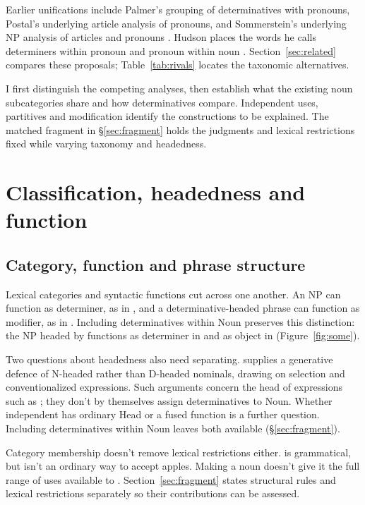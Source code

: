 \documentclass[12pt]{article}
\begin{document}
Earlier unifications include Palmer's grouping of determinatives with pronouns, Postal's underlying article analysis of pronouns, and Sommerstein's underlying NP analysis of articles and pronouns \citep{palmer1924,postal1966,sommerstein1972}. Hudson places the words he calls determiners within pronoun and pronoun within noun \citep{hudson2004determiners,hudson2010wordgrammar}. Section~\ref{sec:related} compares these proposals; Table~\ref{tab:rivals} locates the taxonomic alternatives.

I first distinguish the competing analyses, then establish what the existing noun subcategories share and how determinatives compare. Independent uses, partitives and modification identify the constructions to be explained. The matched fragment in §\ref{sec:fragment} holds the judgments and lexical restrictions fixed while varying taxonomy and headedness.

\section{Classification, headedness and function}\label{sec:alternatives}

\subsection{Category, function and phrase structure}

Lexical categories and syntactic functions cut across one another. An NP can function as determiner, as in , and a determinative-headed phrase can function as modifier, as in  \citep{payne2010,pullummiller2022nps}. Including determinatives within Noun preserves this distinction: the NP headed by  functions as determiner in  and as object in  (Figure~\ref{fig:some}).

Two questions about headedness also need separating. \textcite{bruening2020nominal} supplies a generative defence of N-headed rather than D-headed nominals, drawing on selection and conventionalized expressions. Such arguments concern the head of expressions such as ; they don't by themselves assign determinatives to Noun. Whether independent  has ordinary Head or a fused function is a further question. Including determinatives within Noun leaves both available (§\ref{sec:fragment}).

Category membership doesn't remove lexical restrictions either.  is grammatical, but  isn't an ordinary way to accept apples. Making  a noun doesn't give it the full range of uses available to . Section~\ref{sec:fragment} states structural rules and lexical restrictions separately so their contributions can be assessed.
\end{document}
